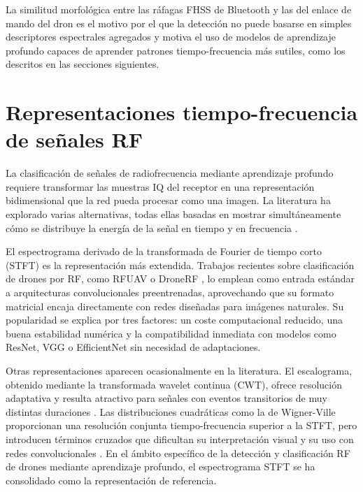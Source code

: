 La similitud morfológica entre las ráfagas FHSS de Bluetooth y las del enlace de mando del dron es el motivo por el que la detección no puede basarse en simples descriptores espectrales agregados y motiva el uso de modelos de aprendizaje profundo capaces de aprender patrones tiempo-frecuencia más sutiles, como los descritos en las secciones siguientes.

\section{Representaciones tiempo-frecuencia de señales RF}
\label{sec:representaciones_tf}

La clasificación de señales de radiofrecuencia mediante aprendizaje profundo requiere transformar las muestras IQ del receptor en una representación bidimensional que la red pueda procesar como una imagen. La literatura ha explorado varias alternativas, todas ellas basadas en mostrar simultáneamente cómo se distribuye la energía de la señal en tiempo y en frecuencia \cite{cohen1995timefrequency,boashash2015timefrequency}.

El espectrograma derivado de la transformada de Fourier de tiempo corto (STFT) es la representación más extendida. Trabajos recientes sobre clasificación de drones por RF, como RFUAV \cite{rfuav2025} o DroneRF \cite{allahham2019dronerf}, lo emplean como entrada estándar a arquitecturas convolucionales preentrenadas, aprovechando que su formato matricial encaja directamente con redes diseñadas para imágenes naturales. Su popularidad se explica por tres factores: un coste computacional reducido, una buena estabilidad numérica y la compatibilidad inmediata con modelos como ResNet, VGG o EfficientNet sin necesidad de adaptaciones.

Otras representaciones aparecen ocasionalmente en la literatura. El escalograma, obtenido mediante la transformada wavelet continua (CWT), ofrece resolución adaptativa y resulta atractivo para señales con eventos transitorios de muy distintas duraciones \cite{mallat2008wavelet}. Las distribuciones cuadráticas como la de Wigner-Ville proporcionan una resolución conjunta tiempo-frecuencia superior a la STFT, pero introducen términos cruzados que dificultan su interpretación visual y su uso con redes convolucionales \cite{boashash2015timefrequency}. En el ámbito específico de la detección y clasificación RF de drones mediante aprendizaje profundo, el espectrograma STFT se ha consolidado como la representación de referencia.




